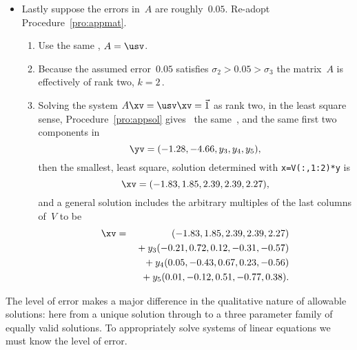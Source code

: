 \begin{example}
\begin{solution}
\begin{itemize}
\item Lastly suppose the errors in~\(A\) are roughly~\(0.05\).
Re-adopt Procedure~\ref{pro:appmat}.
\begin{enumerate}
\item Use the same \svd, \(A=\usv\).
\item Because the assumed error~\(0.05\) satisfies \(\sigma_2>0.05>\sigma_3\) the matrix~\(A\) is effectively of rank two, \(k=2\)\,.
\item Solving the system \(A\xv=\usv\xv=\vec1\) as rank two, in the least square sense, Procedure~\ref{pro:appsol} gives \twodp\ the same~\zv, and the same first two components in
\begin{equation*}
\yv=(-1.28,-4.66,y_3,y_4,y_5),
\end{equation*}
then the smallest, least square, solution determined with 
\verb|x=V(:,1:2)*y| is
\begin{equation*}
\xv=(-1.83,1.85,2.39,2.39,2.27),
\end{equation*}
and a general solution includes the arbitrary multiples of the last columns of~\(V\) to be
\begin{eqnarray*}
\xv&=&(-1.83,1.85,2.39,2.39,2.27)
\\&&{}+y_3(-0.21,0.72,0.12,-0.31,-0.57)
\\&&{}+y_4(0.05,-0.43,0.67,0.23,-0.56)
\\&&{}+y_5(0.01,-0.12,0.51,-0.77,0.38).
\end{eqnarray*}
\end{enumerate}
\end{itemize}
The level of error makes a major difference in the qualitative nature of allowable solutions: here from a unique solution through to a three parameter family of equally valid solutions.
To appropriately solve systems of linear equations we must know the level of error.
\end{solution}
\end{example}





